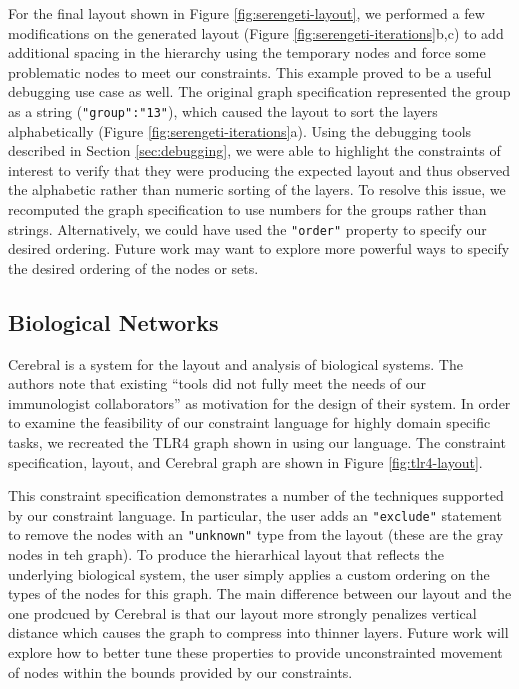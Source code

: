 \serengetiIterations
\tlrFourLayout
For the final layout shown in Figure \ref{fig:serengeti-layout}, we performed a few modifications on the generated layout (Figure \ref{fig:serengeti-iterations}b,c) to add additional spacing in the hierarchy using the temporary nodes and force some problematic nodes to meet our constraints. This example proved to be a useful debugging use case as well. The original graph specification represented the group as a string (\texttt{"group":"13"}), which caused the layout to sort the layers alphabetically (Figure \ref{fig:serengeti-iterations}a). Using the debugging tools described in Section \ref{sec:debugging}, we were able to highlight the constraints of interest to verify that they were producing the expected layout and thus observed the alphabetic rather than numeric sorting of the layers. To resolve this issue, we recomputed the graph specification to use numbers for the groups rather than strings. Alternatively, we could have used the \texttt{"order"} property to specify our desired ordering. Future work may want to explore more powerful ways to specify the desired ordering of the nodes or sets.

\subsection{Biological Networks}
Cerebral \cite{barsky2007cerebral} is a system for the layout and analysis of biological systems. The authors note that existing ``tools did not fully meet the needs of our immunologist collaborators'' as motivation for the design of their system. In order to examine the feasibility of our constraint language for highly domain specific tasks, we recreated the TLR4 graph shown in \cite{barsky2007cerebral} using our language. The constraint specification, layout, and Cerebral graph are shown in Figure \ref{fig:tlr4-layout}.

This constraint specification demonstrates a number of the techniques supported by our constraint language. In particular, the user adds an \texttt{"exclude"} statement to remove the nodes with an \texttt{"unknown"} type from the layout (these are the gray nodes in teh graph). To produce the hierarhical layout that reflects the underlying biological system, the user simply applies a custom ordering on the types of the nodes for this graph. The main difference between our layout and the one prodcued by Cerebral is that our layout more strongly penalizes vertical distance which causes the graph to compress into thinner layers. Future work will explore how to better tune these properties to provide unconstrainted movement of nodes within the bounds provided by our constraints.

